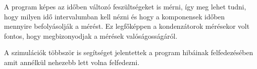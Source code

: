 A program képes az időben változó feszültségeket is mérni, így
meg lehet tudni, hogy milyen idő intervalumban kell nézni és hogy
a komponensek időben mennyire befolyásolják a mérést. Ez 
legfőképpen a kondenzátorok mérésekor volt fontos, hogy megbizonyodjak
a mérések valóságosságáról.

A szimulációk többször is segítséget jelentettek a program 
hibáinak felfedezésében amit annélkül nehezebb lett volna felfedezni.

